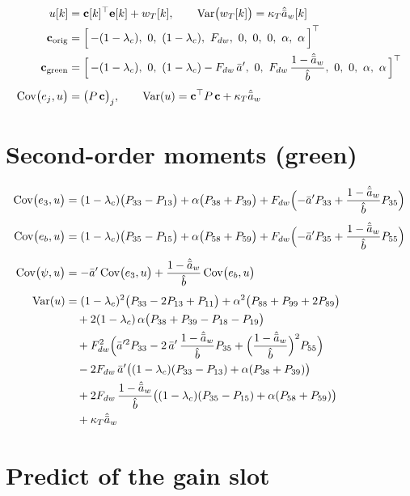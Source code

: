 \documentclass[11pt,a4paper,fontset=none]{ctexart}
\newcommand{\ba}{\bar{a}}
\newcommand{\ap}{\ba'}
\newcommand{\ah}{\hat{\ba}_w}
\newcommand{\bh}{\hat{b}}
\newcommand{\Cov}{\mathrm{Cov}}
\newcommand{\Var}{\mathrm{Var}}
\begin{document}
\begin{align*}
u[k] &= \mathbf{c}[k]^{\top}\mathbf{e}[k] + w_T[k], \qquad \Var\bigl(w_T[k]\bigr) = \kappa_T\ah[k] \\
\mathbf{c}_{\mathrm{orig}} &= \Bigl[\,-(1-\lambda_c),\ 0,\ (1-\lambda_c),\ F_{dw},\ 0,\ 0,\ 0,\ \alpha,\ \alpha\,\Bigr]^{\top} \\
\mathbf{c}_{\mathrm{green}} &= \Bigl[\,-(1-\lambda_c),\ 0,\ (1-\lambda_c) - F_{dw}\,\ap,\ 0,\ F_{dw}\,\frac{1-\ah}{\bh},\ 0,\ 0,\ \alpha,\ \alpha\,\Bigr]^{\top} \\[4pt]
\Cov\bigl(e_j, u\bigr) &= \bigl(P\,\mathbf{c}\bigr)_j, \qquad \Var(u) = \mathbf{c}^{\top}P\,\mathbf{c} + \kappa_T\ah
\end{align*}

\section{Second-order moments (green)}

\begin{align*}
\Cov\bigl(e_3, u\bigr) &= (1-\lambda_c)\bigl(P_{33} - P_{13}\bigr) + \alpha\bigl(P_{38} + P_{39}\bigr)
                          + F_{dw}\Bigl(-\ap P_{33} + \frac{1-\ah}{\bh}P_{35}\Bigr) \\[4pt]
\Cov\bigl(e_b, u\bigr) &= (1-\lambda_c)\bigl(P_{35} - P_{15}\bigr) + \alpha\bigl(P_{58} + P_{59}\bigr)
                          + F_{dw}\Bigl(-\ap P_{35} + \frac{1-\ah}{\bh}P_{55}\Bigr) \\[4pt]
\Cov\bigl(\psi, u\bigr) &= -\ap\,\Cov\bigl(e_3, u\bigr) + \frac{1-\ah}{\bh}\,\Cov\bigl(e_b, u\bigr) \\[4pt]
\Var(u) &= (1-\lambda_c)^{2}\bigl(P_{33} - 2P_{13} + P_{11}\bigr) + \alpha^{2}\bigl(P_{88} + P_{99} + 2P_{89}\bigr) \\
        &\quad + 2(1-\lambda_c)\,\alpha\bigl(P_{38} + P_{39} - P_{18} - P_{19}\bigr) \\
        &\quad + F_{dw}^{2}\Bigl(\ap^{2}P_{33} - 2\,\ap\,\frac{1-\ah}{\bh}P_{35} + \Bigl(\frac{1-\ah}{\bh}\Bigr)^{2}P_{55}\Bigr) \\
        &\quad - 2F_{dw}\,\ap\bigl((1-\lambda_c)(P_{33} - P_{13}) + \alpha(P_{38} + P_{39})\bigr) \\
        &\quad + 2F_{dw}\,\frac{1-\ah}{\bh}\bigl((1-\lambda_c)(P_{35} - P_{15}) + \alpha(P_{58} + P_{59})\bigr) \\
        &\quad + \kappa_T\ah
\end{align*}

\section{Predict of the gain slot}
\end{document}
